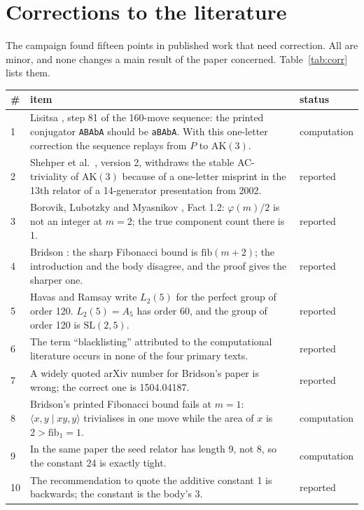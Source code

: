 \documentclass[11pt,a4paper]{article}
\theoremstyle{definition}
\newcommand{\AK}{\mathrm{AK}}
\begin{document}
\section{Corrections to the literature}\label{sec:corrections}

The campaign found fifteen points in published work that need correction. All are minor, and none changes a main result of the paper concerned. Table~\ref{tab:corr} lists them.

\begin{longtable}{p{}p{}p{}}
\toprule
\# & item & status \\
\midrule
\endhead
1 & Lisitsa \cite{Lis25}, step 81 of the 160-move sequence: the printed conjugator \texttt{ABAbA} should be \texttt{aBAbA}. With this one-letter correction the sequence replays from $P$ to $\AK(3)$. & computation \\
2 & Shehper et al.\ \cite{SMF25}, version 2, withdraws the stable AC-triviality of $\AK(3)$ because of a one-letter misprint in the 13th relator of a 14-generator presentation from 2002. & reported \\
3 & Borovik, Lubotzky and Myasnikov \cite{BLM05}, Fact 1.2: $\varphi(m)/2$ is not an integer at $m=2$; the true component count there is 1. & reported \\
4 & Bridson \cite{Bri15}: the sharp Fibonacci bound is $\mathrm{fib}(m+2)$; the introduction and the body disagree, and the proof gives the sharper one. & reported \\
5 & Havas and Ramsay write $L_2(5)$ for the perfect group of order 120. $L_2(5)=A_5$ has order 60, and the group of order 120 is $\mathrm{SL}(2,5)$. & reported \\
6 & The term ``blacklisting'' attributed to the computational literature occurs in none of the four primary texts. & reported \\
7 & A widely quoted arXiv number for Bridson's paper is wrong; the correct one is 1504.04187. & reported \\
8 & Bridson's printed Fibonacci bound fails at $m=1$: $\langle x,y\mid xy,y\rangle$ trivialises in one move while the area of $x$ is $2>\mathrm{fib}_1=1$. & computation \\
9 & In the same paper the seed relator has length 9, not 8, so the constant 24 is exactly tight. & computation \\
10 & The recommendation to quote the additive constant 1 is backwards; the constant is the body's 3. & reported \\

\end{longtable}
\end{document}
